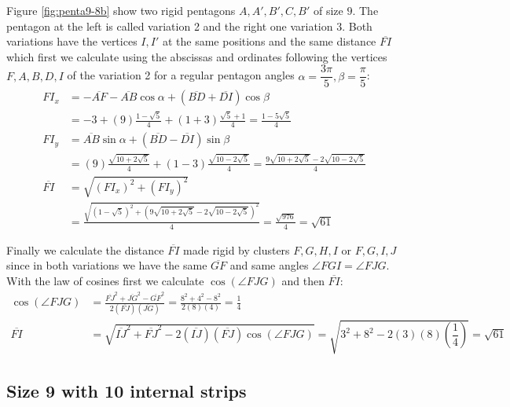 \documentclass[11pt]{article}
\begin{document}
Figure \ref{fig:penta9-8b} show two rigid pentagons $A,A',B',C,B'$ of size $9$. The pentagon at the left is called variation 2 and the right one variation 3. Both variations have the vertices $I,I'$ at the same positions and the same distance $\overline{FI}$ which first we calculate using the abscissas and ordinates following the vertices $F,A,B,D,I$ of the variation 2 for a regular pentagon angles $\alpha=\dfrac{3\pi}5, \beta=\dfrac{\pi}5$:
\begin{align}
FI_x &= -\overline{AF} - \overline{AB}\cos\alpha + (\overline{BD} + \overline{DI})\cos\beta\nonumber\\
 &= -3 + (9)\frac{1-\sqrt5}4 + (1+3)\frac{\sqrt5+1}4 = \frac{1-5\sqrt5}4\\
FI_y &= \overline{AB}\sin\alpha + (\overline{BD}-\overline{DI})\sin\beta\nonumber\\
 &= (9)\frac{\sqrt{10+2\sqrt5}}4 + (1-3)\frac{\sqrt{10-2\sqrt5}}4
 = \frac{9\sqrt{10+2\sqrt5} - 2\sqrt{10-2\sqrt5}}4\\
\overline{FI} &= \sqrt{(FI_x)^2 + (FI_y)^2}\nonumber\\
 &= \frac{\sqrt{(1-\sqrt5)^2 + (9\sqrt{10+2\sqrt5} - 2\sqrt{10-2\sqrt5})^2}}4
 = \frac{\sqrt{976}}4 = \sqrt{61}
\end{align}

Finally we calculate the distance $\overline{FI}$ made rigid by clusters $F,G,H,I$ or $F,G,I,J$ since in both variations we have the same $\overline{GF}$ and same angles $\angle{FGI}=\angle{FJG}$. With the law of cosines first we calculate $\cos(\angle{FJG})$ and then $\overline{FI}$:
\begin{align}
\cos(\angle{FJG}) &= \frac{\overline{FJ}^2 + \overline{JG}^2 - \overline{GF}^2}
 {2(\overline{FJ})(\overline{JG})}
 = \frac{8^2 + 4^2 - 8^2}{2(8)(4)} = \frac{1}4\nonumber\\
\overline{FI} &= \sqrt{\overline{IJ}^2 + \overline{FJ}^2 
 - 2(\overline{IJ})(\overline{FJ})\cos(\angle{FJG})}
 = \sqrt{3^2 + 8^2 - 2(3)(8)\left(\dfrac{1}4\right)} = \sqrt{61}
\end{align}


\subsection{Size 9 with 10 internal strips}
\end{document}
